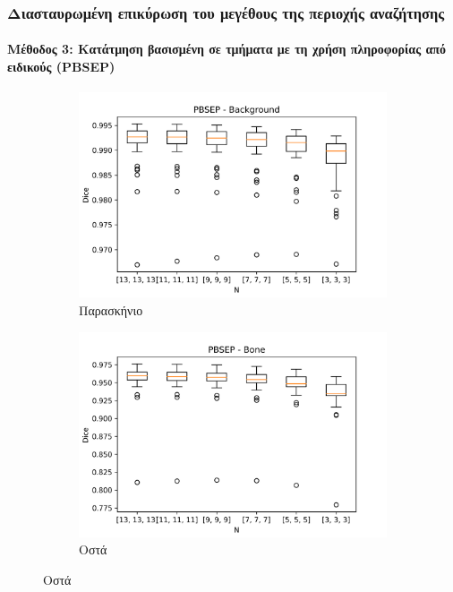 \documentclass{beamer}
\begin{document}
\begin{frame}
\frametitle{Διασταυρωμένη επικύρωση του μεγέθους της περιοχής αναζήτησης}
\framesubtitle{Μέθοδος 3: Κατάτμηση βασισμένη σε τμήματα με τη χρήση πληροφορίας
από ειδικούς (PBSEP)}

\begin{figure}[H]
    \centering

    \begin{subfigure}[b]{0.42\linewidth}
    \includegraphics[width=\linewidth]{PBSEP_N_Background_plot.png}
    \caption{Παρασκήνιο}
    \end{subfigure}
    \begin{subfigure}[b]{0.42\linewidth}
    \includegraphics[width=\linewidth]{PBSEP_N_Bone_plot.png}
    \caption{Οστά}
    \end{subfigure}


\end{figure}
\end{frame}
\end{document}
